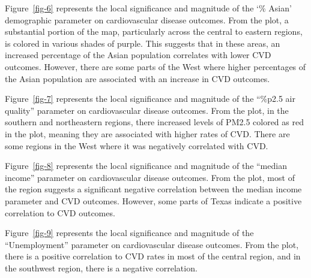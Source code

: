 \documentclass[
]{article}
\begin{document}
Figure~\ref{fig-6} represents the local significance and magnitude of
the `\% Asian' demographic parameter on cardiovascular disease outcomes.
From the plot, a substantial portion of the map, particularly across the
central to eastern regions, is colored in various shades of purple. This
suggests that in these areas, an increased percentage of the Asian
population correlates with lower CVD outcomes. However, there are some
parts of the West where higher percentages of the Asian population are
associated with an increase in CVD outcomes.~

Figure~\ref{fig-7} represents the local significance and magnitude of
the ``\%p2.5 air quality'' parameter on cardiovascular disease outcomes.
From the plot, in the southern and northeastern regions, there increased
levels of PM2.5 colored as red in the plot, meaning they are associated
with higher rates of CVD. There are some regions in the West where it
was negatively correlated with CVD.

Figure~\ref{fig-8} represents the local significance and magnitude of
the ``median income'' parameter on cardiovascular disease outcomes. From
the plot, most of the region suggests a significant negative correlation
between the median income parameter and CVD outcomes. However, some
parts of Texas indicate a positive correlation to CVD outcomes.~

Figure~\ref{fig-9} represents the local significance and magnitude of
the ``Unemployment'' parameter on cardiovascular disease outcomes. From
the plot, there is a positive correlation to CVD rates in most of the
central region, and in the southwest region, there is a negative
correlation.
\end{document}
